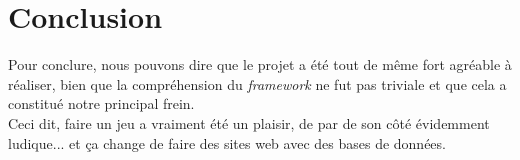 \documentclass[a4paper,10pt]{article}
\begin{document}
\section{Conclusion}
    Pour conclure, nous pouvons dire que le projet a été tout de même fort agréable à réaliser, bien que la compréhension
    du \textit{framework} ne fut pas triviale et que cela a constitué notre principal frein.  \\
    Ceci dit, faire un jeu
    a vraiment été un plaisir, de par de son côté évidemment ludique... et ça change de faire des sites web avec des bases
    de données.
\end{document}
